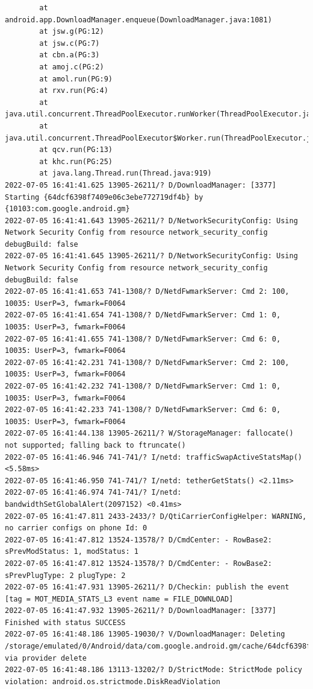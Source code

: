 \documentclass[a4paper,12pt]{book}
\begin{document}
\begin{lstlisting}
        at android.app.DownloadManager.enqueue(DownloadManager.java:1081)
        at jsw.g(PG:12)
        at jsw.c(PG:7)
        at cbn.a(PG:3)
        at amoj.c(PG:2)
        at amol.run(PG:9)
        at rxv.run(PG:4)
        at java.util.concurrent.ThreadPoolExecutor.runWorker(ThreadPoolExecutor.java:1167)
        at java.util.concurrent.ThreadPoolExecutor$Worker.run(ThreadPoolExecutor.java:641)
        at qcv.run(PG:13)
        at khc.run(PG:25)
        at java.lang.Thread.run(Thread.java:919)
2022-07-05 16:41:41.625 13905-26211/? D/DownloadManager: [3377] Starting {64dcf6398f7409e06c3ebe772719df4b} by {10103:com.google.android.gm}
2022-07-05 16:41:41.643 13905-26211/? D/NetworkSecurityConfig: Using Network Security Config from resource network_security_config debugBuild: false
2022-07-05 16:41:41.645 13905-26211/? D/NetworkSecurityConfig: Using Network Security Config from resource network_security_config debugBuild: false
2022-07-05 16:41:41.653 741-1308/? D/NetdFwmarkServer: Cmd 2: 100, 10035: UserP=3, fwmark=F0064
2022-07-05 16:41:41.654 741-1308/? D/NetdFwmarkServer: Cmd 1: 0, 10035: UserP=3, fwmark=F0064
2022-07-05 16:41:41.655 741-1308/? D/NetdFwmarkServer: Cmd 6: 0, 10035: UserP=3, fwmark=F0064
2022-07-05 16:41:42.231 741-1308/? D/NetdFwmarkServer: Cmd 2: 100, 10035: UserP=3, fwmark=F0064
2022-07-05 16:41:42.232 741-1308/? D/NetdFwmarkServer: Cmd 1: 0, 10035: UserP=3, fwmark=F0064
2022-07-05 16:41:42.233 741-1308/? D/NetdFwmarkServer: Cmd 6: 0, 10035: UserP=3, fwmark=F0064
2022-07-05 16:41:44.138 13905-26211/? W/StorageManager: fallocate() not supported; falling back to ftruncate()
2022-07-05 16:41:46.946 741-741/? I/netd: trafficSwapActiveStatsMap() <5.58ms>
2022-07-05 16:41:46.950 741-741/? I/netd: tetherGetStats() <2.11ms>
2022-07-05 16:41:46.974 741-741/? I/netd: bandwidthSetGlobalAlert(2097152) <0.41ms>
2022-07-05 16:41:47.811 2433-2433/? D/QtiCarrierConfigHelper: WARNING, no carrier configs on phone Id: 0
2022-07-05 16:41:47.812 13524-13578/? D/CmdCenter: - RowBase2: sPrevModStatus: 1, modStatus: 1
2022-07-05 16:41:47.812 13524-13578/? D/CmdCenter: - RowBase2: sPrevPlugType: 2 plugType: 2
2022-07-05 16:41:47.931 13905-26211/? D/Checkin: publish the event [tag = MOT_MEDIA_STATS_L3 event name = FILE_DOWNLOAD]
2022-07-05 16:41:47.932 13905-26211/? D/DownloadManager: [3377] Finished with status SUCCESS
2022-07-05 16:41:48.186 13905-19030/? V/DownloadManager: Deleting /storage/emulated/0/Android/data/com.google.android.gm/cache/64dcf6398f7409e06c3ebe772719df4b via provider delete
2022-07-05 16:41:48.186 13113-13202/? D/StrictMode: StrictMode policy violation: android.os.strictmode.DiskReadViolation

\end{lstlisting}
\end{document}
